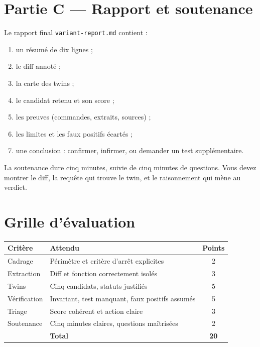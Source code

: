 \documentclass{training}
\begin{document}
\chapter{Partie C --- Rapport et soutenance}

Le rapport final \texttt{variant-report.md} contient :

\begin{enumerate}
  \item un résumé de dix lignes ;
  \item le diff annoté ;
  \item la carte des twins ;
  \item le candidat retenu et son score ;
  \item les preuves (commandes, extraits, sources) ;
  \item les limites et les faux positifs écartés ;
  \item une conclusion : confirmer, infirmer, ou demander un test
        supplémentaire.
\end{enumerate}

La soutenance dure cinq minutes, suivie de cinq minutes de questions. Vous
devez montrer le diff, la requête qui trouve le twin, et le raisonnement qui
mène au verdict.

\chapter{Grille d'évaluation}

\begin{center}
\begin{tabularx}{\linewidth}{|l|X|c|}
\hline
\textbf{Critère} & \textbf{Attendu} & \textbf{Points} \\ \hline
Cadrage & Périmètre et critère d'arrêt explicites & 2 \\ \hline
Extraction & Diff et fonction correctement isolés & 3 \\ \hline
Twins & Cinq candidats, statuts justifiés & 5 \\ \hline
Vérification & Invariant, test manquant, faux positifs assumés & 5 \\ \hline
Triage & Score cohérent et action claire & 3 \\ \hline
Soutenance & Cinq minutes claires, questions maîtrisées & 2 \\ \hline
& \textbf{Total} & \textbf{20} \\ \hline
\end{tabularx}
\end{center}
\end{document}
